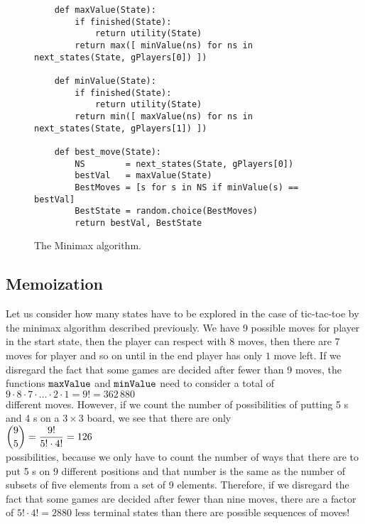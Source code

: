 \begin{figure}[!ht]
\centering
\begin{verbatim}
    def maxValue(State):
        if finished(State):
            return utility(State)
        return max([ minValue(ns) for ns in next_states(State, gPlayers[0]) ])
    
    def minValue(State):  
        if finished(State):
            return utility(State)
        return min([ maxValue(ns) for ns in next_states(State, gPlayers[1]) ])
    
    def best_move(State):
        NS        = next_states(State, gPlayers[0])
        bestVal   = maxValue(State)
        BestMoves = [s for s in NS if minValue(s) == bestVal]
        BestState = random.choice(BestMoves)
        return bestVal, BestState
\end{verbatim}
\caption{The Minimax algorithm.}
\label{fig:Minimax.ipynb}
\end{figure}
\FloatBarrier

\subsection{Memoization}
Let us consider how many states have to be explored in the case of tic-tac-toe by the minimax algorithm
described previously.  We have 9 possible moves for player  in the start state, then the player
 can respect with 8 moves, then there are 7 moves for player  and so on until in the end
player  has only $1$ move left.  If we disregard 
the fact that some games are decided after fewer than 9 moves, the functions $\texttt{maxValue}$ and
$\texttt{minValue}$ need to consider  a total of
\\[0.2cm]
\hspace*{1.3cm}
$9 \cdot 8 \cdot 7 \cdot {\dots} \cdot 2 \cdot 1 = 9! = 362\,880$
\\[0.2cm]
different moves.  However, if we count the number of possibilities of putting 5 s and 4
s on a $3 \times 3$ board, we see that there are only
\\[0.2cm]
\hspace*{1.3cm}
$\displaystyle {9 \choose 5} = \frac{9!}{5! \cdot 4!} = 126$
\\[0.2cm]
possibilities, because we only have to count the number of ways that there are to put 5 s on
9 different positions and that number is the same as the number of subsets of five
elements from a set of 9 elements. 
Therefore, if we disregard the fact that some games are decided after fewer than nine moves,  there are a
factor of $5! \cdot 4! = 2880$ less terminal states than there are possible sequences of moves!

